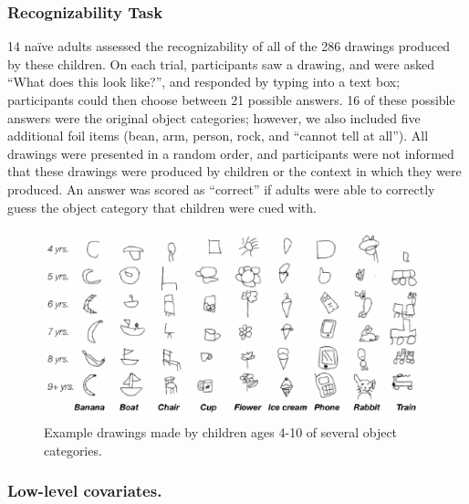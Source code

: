 \documentclass[10pt, letterpaper]{article}
\newenvironment{CodeChunk}{}{}
\begin{document}
\subsubsection{Recognizability Task}\label{recognizability-task}

14 naïve adults assessed the recognizability of all of the 286 drawings
produced by these children. On each trial, participants saw a drawing,
and were asked ``What does this look like?'', and responded by typing
into a text box; participants could then choose between 21 possible
answers. 16 of these possible answers were the original object
categories; however, we also included five additional foil items (bean,
arm, person, rock, and ``cannot tell at all''). All drawings were
presented in a random order, and participants were not informed that
these drawings were produced by children or the context in which they
were produced. An answer was scored as ``correct'' if adults were able
to correctly guess the object category that children were cued with.

\begin{CodeChunk}
\begin{figure}[h]

{\centering \includegraphics[width=1\linewidth]{figs/exampleDrawings-1} 

}

\caption[Example drawings made by children ages 4-10 of several object  categories]{Example drawings made by children ages 4-10 of several object  categories.}\label{fig:exampleDrawings}
\end{figure}
\end{CodeChunk}

\subsubsection{Low-level covariates.}\label{low-level-covariates.}
\end{document}
